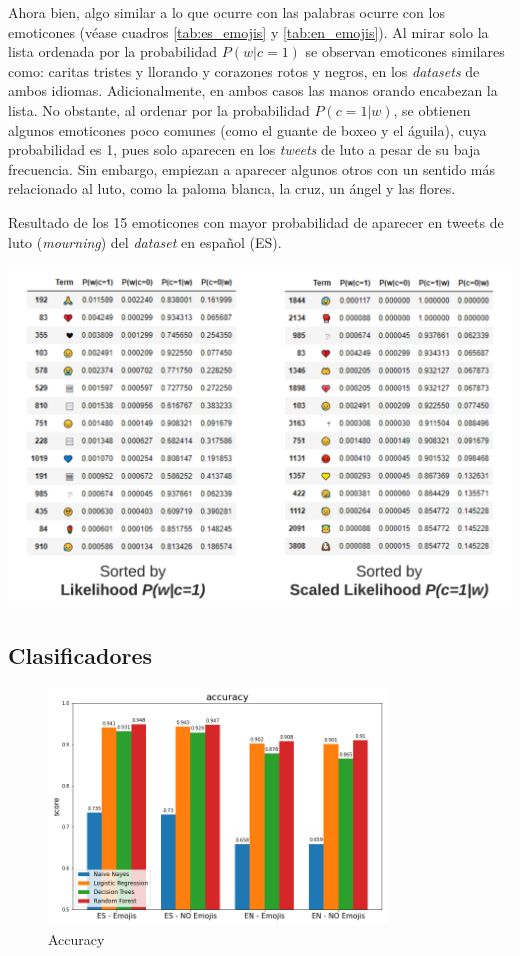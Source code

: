 Ahora bien, algo similar a lo que ocurre con las palabras ocurre con los emoticones (véase cuadros \ref{tab:es_emojis} y \ref{tab:en_emojis}). Al mirar solo la lista ordenada por la probabilidad $P(w|c=1)$ se observan emoticones similares como: caritas tristes y llorando y corazones rotos y negros, en los \textit{datasets} de ambos idiomas. Adicionalmente, en ambos casos las manos orando encabezan la lista. No obstante, al ordenar por la probabilidad $P(c=1|w)$, se obtienen algunos emoticones poco comunes (como el guante de boxeo y el águila), cuya probabilidad es 1, pues solo aparecen en los \textit{tweets} de luto a pesar de su baja frecuencia. Sin embargo, empiezan a aparecer algunos otros con un sentido más relacionado al luto, como la paloma blanca, la cruz, un ángel y las flores. 

\begin{table}[H]
    \centering
    \caption{Resultado de los 15 emoticones con mayor probabilidad de aparecer en tweets de luto (\textit{mourning}) del \textit{dataset} en español (ES).}
    \label{tab:en_emojis}
    \includegraphics[width=\textwidth]{doc/images/EN_Emojis.png}
\end{table}

\subsection{Clasificadores}

\begin{figure}
    \centering
    \includegraphics[width=0.8\textwidth]{results/mourning_tweets_accuracy.png}
    \caption{Accuracy}
    \label{fig:mt_acc}
\end{figure}


